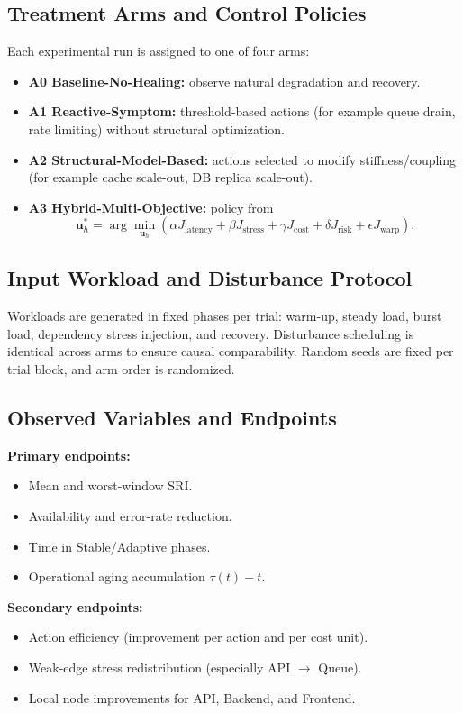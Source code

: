 \documentclass[conference]{IEEEtran}
\begin{document}
\subsection{Treatment Arms and Control Policies}
Each experimental run is assigned to one of four arms:
\begin{itemize}
\item \textbf{A0 Baseline-No-Healing:} observe natural degradation and recovery.
\item \textbf{A1 Reactive-Symptom:} threshold-based actions (for example queue drain, rate limiting) without structural optimization.
\item \textbf{A2 Structural-Model-Based:} actions selected to modify stiffness/coupling (for example cache scale-out, DB replica scale-out).
\item \textbf{A3 Hybrid-Multi-Objective:} policy from
\begin{equation}
\mathbf{u}_h^*=\arg\min_{\mathbf{u}_h}
\left(\alpha J_{\mathrm{latency}}+\beta J_{\mathrm{stress}}+\gamma J_{\mathrm{cost}}+\delta J_{\mathrm{risk}}+\epsilon J_{\mathrm{warp}}\right).
\label{eq:objective}
\end{equation}
\end{itemize}

\subsection{Input Workload and Disturbance Protocol}
Workloads are generated in fixed phases per trial: warm-up, steady load, burst load, dependency stress injection, and recovery. Disturbance scheduling is identical across arms to ensure causal comparability. Random seeds are fixed per trial block, and arm order is randomized.

\subsection{Observed Variables and Endpoints}
\textbf{Primary endpoints:}
\begin{itemize}
\item Mean and worst-window SRI.
\item Availability and error-rate reduction.
\item Time in Stable/Adaptive phases.
\item Operational aging accumulation $\tau(t)-t$.
\end{itemize}

\textbf{Secondary endpoints:}
\begin{itemize}
\item Action efficiency (improvement per action and per cost unit).
\item Weak-edge stress redistribution (especially API $\rightarrow$ Queue).
\item Local node improvements for API, Backend, and Frontend.
\end{itemize}
\end{document}
